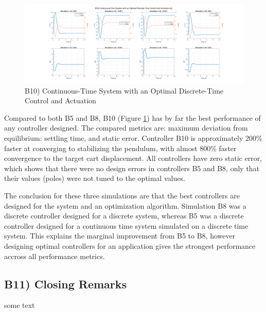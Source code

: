 \documentclass{article}
\begin{document}
\begin{figure}[H]
    \centering
    \includegraphics[width=\textwidth]{figures/b10.png}
    \caption{B10) Continuous-Time System with an Optimal Discrete-Time Control and Actuation}
    \label{B10}
\end{figure}

Compared to both B5 and B8, B10 (Figure \ref{B10}) has by far the best performance of any controller designed. The compared metrics are: maximum deviation from equilibrium: settling time, and static error. Controller B10 is approximately 200\% faster at converging to stabilizing the pendulum, with almost 800\% faster convergence to the target cart displacement. All controllers have zero static error, which shows that there were no design errors in controllers B5 and B8, only that their values (poles) were not tuned to the optimal values.
\newline

The conclusion for these three simulations are that the best controllers are designed for the system and an optimization algorithm. Simulation B8 was a discrete controller designed for a discrete system, whereas B5 was a discrete controller designed for a continuous time system simulated on a discrete time system. This explains the marginal improvement from B5 to B8, however designing optimal controllers for an application gives the strongest performance accross all performance metrics.

\subsection*{B11) Closing Remarks}
some text
\end{document}
